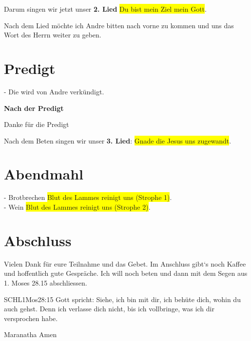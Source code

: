 \documentclass{../inc/mybib}
\begin{document}
\begin{spacing}{1.5}

\end{spacing}
Darum singen wir jetzt unser \textbf{2. Lied} \colorbox{yellow}{Du bist mein Ziel mein Gott}.

Nach dem Lied möchte ich Andre bitten nach vorne zu kommen und uns das Wort des Herrn weiter zu geben.

\section{Predigt}
- Die wird von Andre verkündigt.

\textbf{Nach der Predigt}

Danke für die Predigt

Nach dem Beten singen wir unser \textbf{3. Lied}: \colorbox{yellow}{Gnade die Jesus uns zugewandt}.\\

\section{Abendmahl}
- Brotbrechen
\colorbox{yellow}{Blut des Lammes reinigt uns (Strophe 1)}.\\
- Wein
\colorbox{yellow}{Blut des Lammes reinigt uns (Strophe 2)}.\\

\section{Abschluss}
Vielen Dank für eure Teilnahme und das Gebet. Im Anschluss gibt`s noch Kaffee und hoffentlich gute Gespräche.
Ich will noch beten und dann mit dem Segen aus 1. Moses 28.15 abschliessen.
\begin{bibelbox}{SCHL}{1Mos}{28:15}
Gott spricht: Siehe, ich bin mit dir,
ich behüte dich, wohin du auch gehst.
Denn ich verlasse dich nicht,
bis ich vollbringe, was ich dir versprochen habe.
\end{bibelbox}
Maranatha Amen
\end{document}

